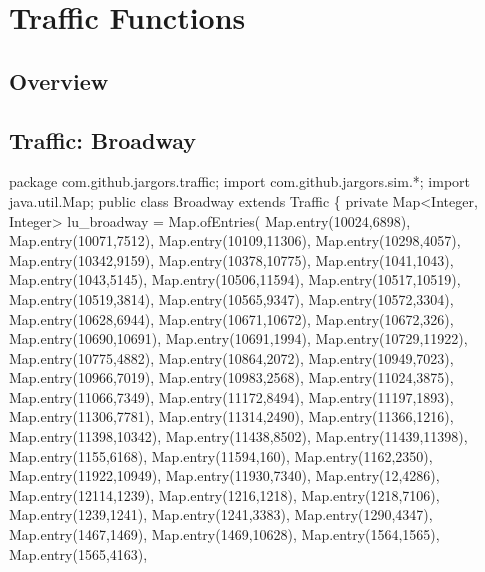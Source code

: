 \nwenddocs{}\part{Traffic Functions}
\label{part-traffic}

\chapter{Overview}
\label{traffic-overview}

\nwenddocs{}\chapter{Traffic: Broadway}

\nwenddocs{}\endmoddef\nwstartdeflinemarkup\nwenddeflinemarkup
package com.github.jargors.traffic;
import com.github.jargors.sim.*;
import java.util.Map;
public class Broadway extends Traffic \{
  private Map<Integer, Integer> lu_broadway = Map.ofEntries(
    Map.entry(10024,6898),
    Map.entry(10071,7512),
    Map.entry(10109,11306),
    Map.entry(10298,4057),
    Map.entry(10342,9159),
    Map.entry(10378,10775),
    Map.entry(1041,1043),
    Map.entry(1043,5145),
    Map.entry(10506,11594),
    Map.entry(10517,10519),
    Map.entry(10519,3814),
    Map.entry(10565,9347),
    Map.entry(10572,3304),
    Map.entry(10628,6944),
    Map.entry(10671,10672),
    Map.entry(10672,326),
    Map.entry(10690,10691),
    Map.entry(10691,1994),
    Map.entry(10729,11922),
    Map.entry(10775,4882),
    Map.entry(10864,2072),
    Map.entry(10949,7023),
    Map.entry(10966,7019),
    Map.entry(10983,2568),
    Map.entry(11024,3875),
    Map.entry(11066,7349),
    Map.entry(11172,8494),
    Map.entry(11197,1893),
    Map.entry(11306,7781),
    Map.entry(11314,2490),
    Map.entry(11366,1216),
    Map.entry(11398,10342),
    Map.entry(11438,8502),
    Map.entry(11439,11398),
    Map.entry(1155,6168),
    Map.entry(11594,160),
    Map.entry(1162,2350),
    Map.entry(11922,10949),
    Map.entry(11930,7340),
    Map.entry(12,4286),
    Map.entry(12114,1239),
    Map.entry(1216,1218),
    Map.entry(1218,7106),
    Map.entry(1239,1241),
    Map.entry(1241,3383),
    Map.entry(1290,4347),
    Map.entry(1467,1469),
    Map.entry(1469,10628),
    Map.entry(1564,1565),
    Map.entry(1565,4163),
